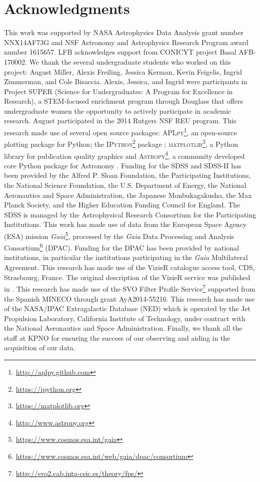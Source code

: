 \documentclass[apj, revtex4-1]{emulateapj}
\begin{document}
\section*{Acknowledgments}
This work was supported by NASA Astrophysics Data Analysis grant number NNX14AF73G and NSF Astronomy and Astrophysics Research Program award number 1615657. LFB acknowledges support from CONICYT project Basal AFB-170002. We thank the several undergraduate students who worked on this project: August Miller, Alexis Freiling, Jessica Kerman, Kevin Feigelis, Ingrid Zimmerman, and Cole Bisaccia. Alexis, Jessica, and Ingrid were participants in Project SUPER (Science for Undergraduates: A Program for Excellence in Research), a STEM-focused enrichment program through Douglass that offers undergraduate women the opportunity to actively participate in academic research. August participated in the 2014 Rutgers NSF REU program.
This research made use of several open source packages: \textsc{APLpy}\footnote{\url{http://aplpy.github.com}}, an open-source plotting package for Python; the \textsc{IPython}\footnote{\url{https://ipython.org}} package \citep{Perez2007}; \textsc{matplotlib}\footnote{\url{https://matplotlib.org}}, a Python library for publication quality graphics \citep{Hunter2007} and \textsc{Astropy}\footnote{\url{http://www.astropy.org}}, a community developed core Python package for Astronomy \citep{TheAstropyCollaboration2013}.
Funding for the SDSS and SDSS-II has been provided by the Alfred P. Sloan Foundation, the Participating Institutions, the National Science Foundation, the U.S. Department of Energy, the National Aeronautics and Space Administration, the Japanese Monbukagakusho, the Max Planck Society, and the Higher Education Funding Council for England. The SDSS is managed by the Astrophysical Research Consortium for the Participating Institutions.
This work has made use of data from the European Space Agency (ESA) mission \textit{Gaia}\footnote{\url{https://www.cosmos.esa.int/gaia}}, processed by the \textit{Gaia} Data Processing and Analysis Consortium\footnote{\url{https://www.cosmos.esa.int/web/gaia/dpac/consortium}} (DPAC). Funding for the DPAC has been provided by national institutions, in particular the institutions participating in the \textit{Gaia} Multilateral Agreement.
This research has made use of the VizieR catalogue access tool, CDS, Strasbourg, France. The original description of the VizieR service was published in \cite{Ochsenbein2000}.
This research has made use of the SVO Filter Profile Service\footnote{\url{http://svo2.cab.inta-csic.es/theory/fps/}} supported from the Spanish MINECO through grant AyA2014-55216.
This research has made use of the NASA/IPAC Extragalactic Database (NED) which is operated by the Jet Propulsion Laboratory, California Institute of Technology, under contract with the National Aeronautics and Space Administration.
Finally, we thank all the staff at KPNO for ensuring the success of our observing and aiding in the acquisition of our data.




\end{document}
